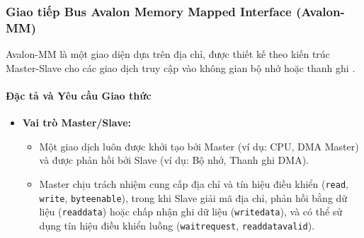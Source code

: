 \subsubsection{Giao tiếp Bus Avalon Memory Mapped Interface (Avalon-MM)}
Avalon-MM là một giao diện dựa trên địa chỉ, được thiết kế theo kiến trúc Master-Slave cho các giao dịch truy cập vào không gian bộ nhớ hoặc thanh ghi \cite{avalon_mm_transfer}.

\paragraph{Đặc tả và Yêu cầu Giao thức}
\begin{itemize}
    \item \textbf{Vai trò Master/Slave:}
    \begin{itemize}
        \item Một giao dịch luôn được khởi tạo bởi Master (ví dụ: CPU, DMA Master) và được phản hồi bởi Slave (ví dụ: Bộ nhớ, Thanh ghi DMA).
        \item Master chịu trách nhiệm cung cấp địa chỉ và tín hiệu điều khiển (\texttt{read}, \texttt{write}, \texttt{byteenable}), trong khi Slave giải mã địa chỉ, phản hồi bằng dữ liệu (\texttt{readdata}) hoặc chấp nhận ghi dữ liệu (\texttt{writedata}), và có thể sử dụng tín hiệu điều khiển luồng (\texttt{waitrequest}, \texttt{readdatavalid}).
    \end{itemize} 


\end{itemize}
